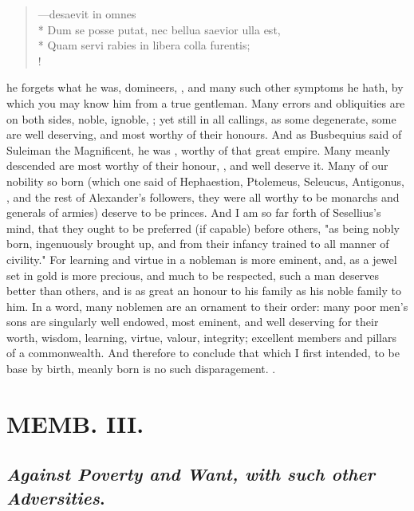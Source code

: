 {\begin{latin}
\begin{verse}%
---desaevit in omnes\\*
Dum se posse putat, nec bellua saevior ulla est,\\*
Quam servi rabies in libera colla furentis;\\!
\end{verse}%
\end{latin}
%

he forgets what he was, domineers, \etc{}, and many such other symptoms he hath, by which you may know him from a true gentleman. Many errors and obliquities are on both sides, noble, ignoble, ; yet still in all callings, as some degenerate, some are well deserving, and most worthy of their honours. And as Busbequius said of Suleiman the Magnificent, he was , worthy of that great empire. Many meanly descended are most worthy of their honour, , and well deserve it. Many of our nobility so born (which one said of Hephaestion, Ptolemeus, Seleucus, Antigonus, \etc{}, and the rest of Alexander's followers, they were all worthy to be monarchs and generals of armies) deserve to be princes. And I am so far forth of Sesellius's mind, that they ought to be preferred (if capable) before others, "as being nobly born, ingenuously brought up, and from their infancy trained to all manner of civility." For learning and virtue in a nobleman is more eminent, and, as a jewel set in gold is more precious, and much to be respected, such a man deserves better than others, and is as great an honour to his family as his noble family to him. In a word, many noblemen are an ornament to their order: many poor men's sons are singularly well endowed, most eminent, and well deserving for their worth, wisdom, learning, virtue, valour, integrity; excellent members and pillars of a commonwealth. And therefore to conclude that which I first intended, to be base by birth, meanly born is no such disparagement. .

\chapter{ MEMB. III.}


\section{\emph{Against Poverty and Want, with such other Adversities}.}


}
